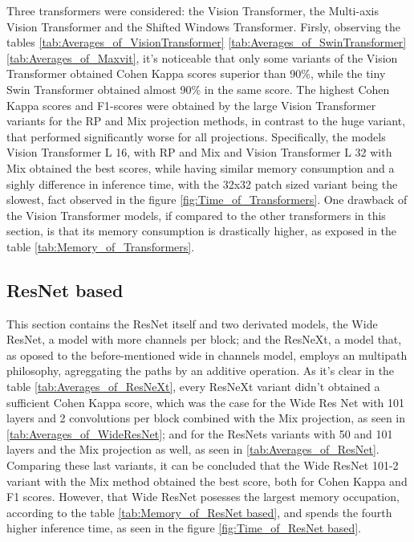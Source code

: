 Three transformers were considered: the Vision Transformer, the Multi-axis Vision Transformer and the Shifted Windows Transformer. Firsly, observing the tables \ref{tab:Averages_of_VisionTransformer} \ref{tab:Averages_of_SwinTransformer} \ref{tab:Averages_of_Maxvit}, it's noticeable that only some variants of the Vision Transformer obtained Cohen Kappa scores superior than 90\%, while the tiny Swin Transformer obtained almost 90\% in the same score. The highest Cohen Kappa scores and F1-scores were obtained by the large Vision Transformer variants for the \acrshort{RP} and \acrshort{Mix} projection methods, in contrast to the huge variant, that performed significantly worse for all projections. Specifically, the models Vision Transformer L 16, with \acrshort{RP} and \acrshort{Mix} and Vision Transformer L 32 with \acrshort{Mix} obtained the best scores, while having similar memory consumption and a sighly difference in inference time, with the 32x32 patch sized variant being the slowest, fact observed in the figure \ref{fig:Time_of_Transformers}. One drawback of the Vision Transformer models, if compared to the other transformers in this section, is that its memory consumption is drastically higher, as exposed in the table \ref{tab:Memory_of_Transformers}. 

\pagebreak

\subsection{ResNet based}


%





This section contains the ResNet itself and two derivated models, the Wide ResNet, a model with more channels per block; and the ResNeXt, a model that, as oposed to the before-mentioned wide in channels model, employs an multipath philosophy, agreggating the paths by an additive operation. As it's clear in the table \ref{tab:Averages_of_ResNeXt}, every ResNeXt variant didn't obtained a sufficient Cohen Kappa score, which was the case for the Wide Res Net with 101 layers and 2 convolutions per block combined with the \acrshort{Mix} projection, as seen in \ref{tab:Averages_of_WideResNet}; and for the ResNets variants with 50 and 101 layers and the \acrshort{Mix} projection as well,  as seen in \ref{tab:Averages_of_ResNet}. Comparing these last variants, it can be concluded that the Wide ResNet 101-2 variant with the \acrshort{Mix} method obtained the best score, both for Cohen Kappa and F1 scores. However, that Wide ResNet posesses the largest memory occupation, according to the table \ref{tab:Memory_of_ResNet based}, and spends the fourth higher inference time, as seen in the figure \ref{fig:Time_of_ResNet based}. 

